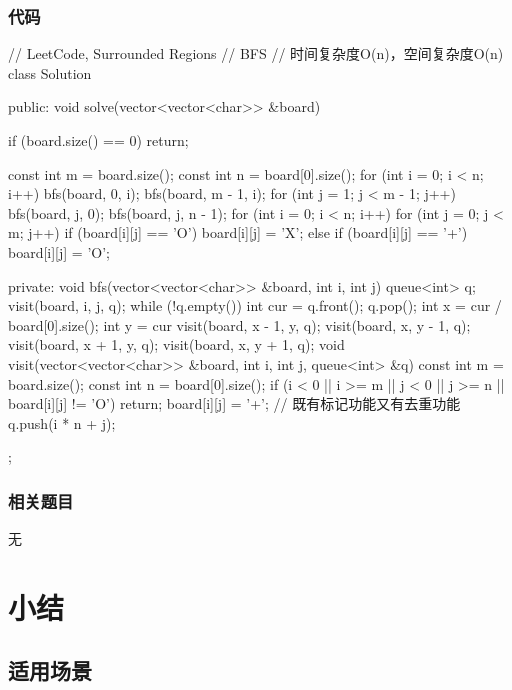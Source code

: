 \subsubsection{代码}
\begin{Code}
// LeetCode, Surrounded Regions
// BFS
// 时间复杂度O(n)，空间复杂度O(n)
class Solution {
public:
    void solve(vector<vector<char>> &board) {
        if (board.size() == 0) return;

        const int m = board.size();
        const int n = board[0].size();
        for (int i = 0; i < n; i++) {
            bfs(board, 0, i);
            bfs(board, m - 1, i);
        }
        for (int j = 1; j < m - 1; j++) {
            bfs(board, j, 0);
            bfs(board, j, n - 1);
        }
        for (int i = 0; i < n; i++)
            for (int j = 0; j < m; j++)
                if (board[i][j] == 'O')
                    board[i][j] = 'X';
                else if (board[i][j] == '+')
                    board[i][j] = 'O';
    }
private:
    void bfs(vector<vector<char>> &board, int i, int j) {
        queue<int> q;
        visit(board, i, j, q);
        while (!q.empty()) {
            int cur = q.front(); q.pop();
            int x = cur / board[0].size();
            int y = cur %
            visit(board, x - 1, y, q);
            visit(board, x, y - 1, q);
            visit(board, x + 1, y, q);
            visit(board, x, y + 1, q);
        }
    }
    void visit(vector<vector<char>> &board, int i, int j, queue<int> &q) {
        const int m = board.size();
        const int n = board[0].size();
        if (i < 0 || i >= m || j < 0 || j >= n || board[i][j] != 'O')
            return;
        board[i][j] = '+'; // 既有标记功能又有去重功能
        q.push(i * n + j);
    }
};
\end{Code}


\subsubsection{相关题目}

\begindot
\item 无
\myenddot


\section{小结} %
\label{sec:bfs-template}


\subsection{适用场景}

